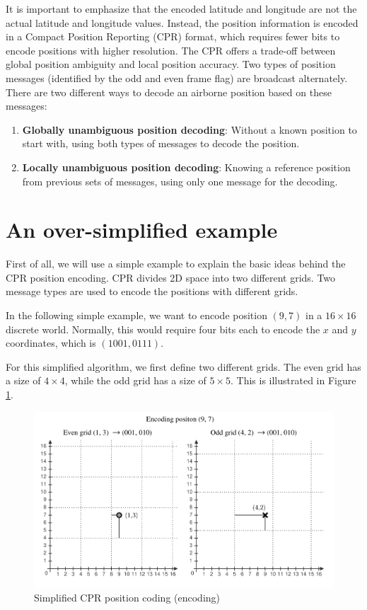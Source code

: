 It is important to emphasize that the encoded latitude and longitude are not the actual latitude and longitude values. Instead, the position information is encoded in a Compact Position Reporting (CPR) format, which requires fewer bits to encode positions with higher resolution. The CPR offers a trade-off between global position ambiguity and local position accuracy. Two types of position messages (identified by the odd and even frame flag) are broadcast alternately. There are two different ways to decode an airborne position based on these messages:

\begin{enumerate}
\item \textbf{Globally unambiguous position decoding}: Without a known position to start with, using both types of messages to decode the position.
\item \textbf{Locally unambiguous position decoding}: Knowing a reference position from previous sets of messages, using only one message for the decoding.
\end{enumerate}


\section{An over-simplified example}
First of all, we will use a simple example to explain the basic ideas behind the CPR position encoding. CPR divides 2D space into two different grids. Two message types are used to encode the positions with different grids.

In the following simple example, we want to encode position $(9, 7)$ in a $16\times16$ discrete world. Normally, this would require four bits each to encode the $x$ and $y$ coordinates, which is $(1001, 0111)$.

For this simplified algorithm, we first define two different grids. The even grid has a size of $4\times4$, while the odd grid has a size of $5\times5$. This is illustrated in Figure \ref{fig:cpr_simple_1}.


\begin{figure}[!ht]
  \includegraphics[width=0.9\linewidth]{figures/adsb/cpr_simple_1.pdf}
  \caption{Simplified CPR position coding (encoding)}
  \label{fig:cpr_simple_1}
\end{figure}

